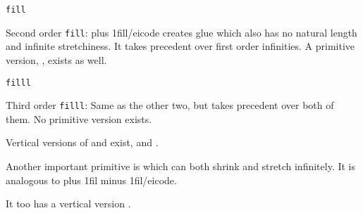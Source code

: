     \textbox{}
        \centerline{\color{white}\tt fill}
    \endtextbox

    \textbox[fillexbox]\empty{4cm}{\p@filexbox@ey + .5cm}{\hsize-5cm}{}
        Second order {\tt fill}: \icode \hskip 0pt plus 1fill\relax/eicode{} creates glue which also has no natural length and infinite stretchiness.
        It takes precedent over first order infinities.
        A primitive version, \macroname\hfill, exists as well.
    \endtextbox

    \textbox{}
        \centerline{\color{white}\tt filll}
    \endtextbox

    \textbox[filllexbox]\empty{4cm}{\p@fillexbox@ey + .5cm}{\hsize-5cm}{}
        Third order {\tt filll}: Same as the other two, but takes precedent over both of them.
        No primitive version exists.
    \endtextbox

    \textbox\empty{1cm}{\p@filllexbox@ey + .5cm}{\hsize-2cm}{}
        Vertical versions of \macroname\hfil{} and \macroname\hfill{} exist, \macroname\vfil{} and \macroname\vfill.

        Another important primitive is \macroname\hss{} which can both shrink and stretch infinitely.
        It is analogous to \icode \hskip 0pt plus 1fil minus 1fil/eicode.

        It too has a vertical version \macroname\vss.
    \endtextbox

\endslide

\beginslide
    \bheadline

